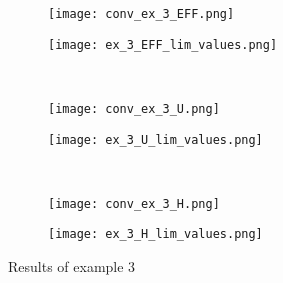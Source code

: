 \begin{figure*}[h]
    \begin{subfigure}{.5\textwidth}
        \centering
        \texttt{[image: conv\_ex\_3\_EFF.png]}
      \end{subfigure}%
      \begin{subfigure}{.5\textwidth}
        \centering
        \texttt{[image: ex\_3\_EFF\_lim\_values.png]}
      \end{subfigure}%
      \\
      \begin{subfigure}{.5\textwidth}
        \centering
        \texttt{[image: conv\_ex\_3\_U.png]}
      \end{subfigure}%
      \begin{subfigure}{.5\textwidth}
        \centering
        \texttt{[image: ex\_3\_U\_lim\_values.png]}
      \end{subfigure}%
      \\    \begin{subfigure}{.5\textwidth}
        \centering
        \texttt{[image: conv\_ex\_3\_H.png]}
      \end{subfigure}%
      \begin{subfigure}{.5\textwidth}
        \centering
        \texttt{[image: ex\_3\_H\_lim\_values.png]}
      \end{subfigure}%
      \caption{Results of example 3}
      \label{fig:ex3_results}
\end{figure*}